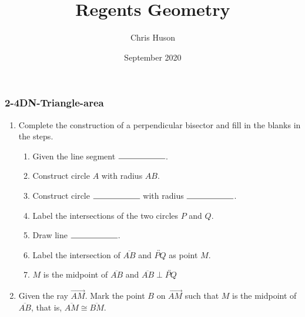 \documentclass[12pt, twoside]{article}
\title{Regents Geometry}
\author{Chris Huson}
\date{September 2020}
\begin{document}
\subsubsection*{2-4DN-Triangle-area}
\begin{enumerate}
\item Complete the construction of a perpendicular bisector and fill in the blanks in the steps.
      \begin{enumerate}
        \item Given the line segment $\rule{2cm}{0.15mm}$.
        \item Construct circle $A$ with radius $AB$.
        \bigskip
        \item Construct circle $\rule{2cm}{0.15mm}$  with radius $\rule{2cm}{0.15mm}$. 
        \item Label the intersections of the two circles $P$ and $Q$. \bigskip
        \item Draw line $\rule{2cm}{0.15mm}$.
        \item Label the intersection of $\overline{AB}$ and $\overleftrightarrow{PQ}$ as point $M$.
        \item $M$ is the midpoint of $\overline{AB}$ and $\overline{AB} \perp \overleftrightarrow{PQ}$
      \end{enumerate}
      \vspace{7cm}
      \begin{center}
      \end{center}

\newpage

\item Given the ray $\overrightarrow{AM}$. Mark the point $B$ on $\overrightarrow{AM}$ such that $M$ is the midpoint of $\overline{AB}$,  that is, $\overline{AM} \cong \overline{BM}$.\\[0.75cm]
\vspace{1cm}


\end{enumerate}
\end{document}
